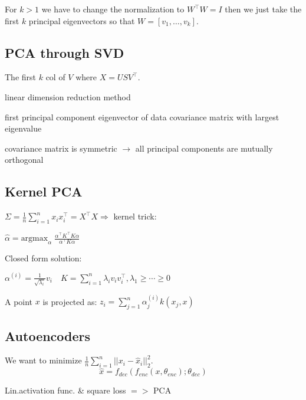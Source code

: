 For $k > 1$ we have to change the normalization to $W^\top W = I$ then we just take the first $k$ principal eigenvectors so that $W = [v_1, \ldots, v_k]$.

\subsection*{PCA through SVD}
\begin{compactitem}
	\item The first $k$ col of $V$ where $X = U S V^\top$.
	\item linear dimension reduction method
	\item first principal component eigenvector of data covariance matrix with largest eigenvalue
	\item covariance matrix is symmetric $\rightarrow$ all principal components are mutually orthogonal
\end{compactitem}	

\subsection*{Kernel PCA}

$\Sigma = \frac{1}{n} \sum_{i=1}^n x_i x_i^\top = X^\top X \Rightarrow$  kernel trick:

\qquad \qquad $\hat{\alpha} = \text{argmax}_\alpha \; \frac{\alpha^\top K^\top K \alpha}{\alpha^\top K \alpha}$

Closed form solution:

$\alpha^{(i)} = \frac{1}{\sqrt{\lambda_i}}v_i \quad K = \sum_{i = 1}^n \lambda_i v_i v_i^\top, \lambda_1 \geq \cdots \geq 0$

A point $x$ is projected as:
$z_i = \sum_{j=1}^n \alpha_j^{(i)} k(x_j, x)$

\subsection*{Autoencoders}

We want to minimize $\frac{1}{n}\sum_{i=1}^n ||x_i - \hat{x}_i||_2^2$.
\[
	\hat{x} = f_{dec}(f_{enc}(x, \theta_{enc}); \theta_{dec})
\]

Lin.activation func. \& square loss $=>$ PCA